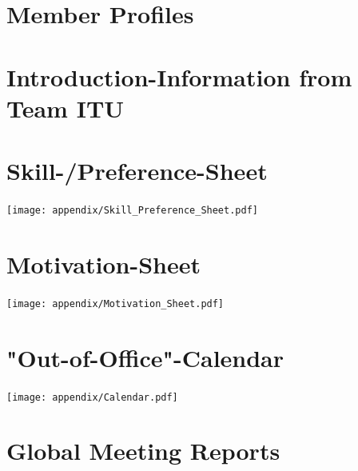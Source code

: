 \section{Member Profiles} 
\label{sec:member_profiles}








\section{Introduction-Information from Team ITU} 
\label{sec:summaryITU}


\section{Skill-/Preference-Sheet} \label{sec:Skill_Preference_Sheet}
\texttt{[image: appendix/Skill\_Preference\_Sheet.pdf]}

\section{Motivation-Sheet} 
\label{sec:Motivation_Sheet}
\texttt{[image: appendix/Motivation\_Sheet.pdf]}

\section{"Out-of-Office"-Calendar} 
\label{sec:Calendar}
\texttt{[image: appendix/Calendar.pdf]}

\section{Global Meeting Reports}








